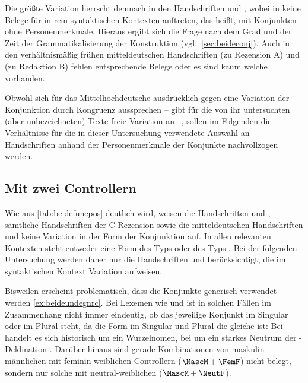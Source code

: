 Die größte Varia\-tion herrscht demnach in den Handschriften \citet{kc:A1} und
\citet{kc:VB}, wobei in \citet{kc:A1} keine Belege für 
in rein syntaktischen Kontexten auftreten, das heißt, mit Konjunkten ohne
Personen\-merkmale. Hieraus ergibt sich die Frage nach dem Grad und der Zeit
der Grammatikalisierung der Konstruktion (vgl.~\cref{sec:beideconj}). Auch in
den verhältnismäßig frühen mitteldeutschen Handschriften \citet{kc:H} (zu
Rezension A) und \citet{kc:P} (zu Redaktion B) fehlen entsprechende Belege oder
es sind kaum welche vorhanden.

Obwohl sich \citet{gjelsten1980,ksw2} für das Mittelhochdeutsche ausdrücklich
gegen eine Variation der Konjunktion  durch Kongruenz aussprechen
-- \citet{gjelsten1980} gibt für die von ihr untersuchten (aber unbezeichneten)
Texte freie Variation an --, sollen im Folgenden die Verhältnisse für die in
dieser Untersuchung verwendete Auswahl an \citet{kc}-Handschriften anhand
der Personen\-merkmale der Konjunkte nachvollzogen werden.

\subsection{Mit zwei Controllern}
\label{subsec:konj2ctrl}

Wie aus \cref{tab:beidefuncpos} deutlich wird, weisen die Handschriften
\citet{kc:M} und \citet{kc:B1}, sämtliche Handschriften der C-Rezension
\citep{kc:C1, kc:K, kc:Z} sowie die mitteldeutschen Handschriften \citet{kc:H}
und \citet{kc:P} keine Variation in der Form der Konjunktion auf. In allen
relevanten Kontexten steht entweder eine Form des Typs 
\citep{kc:H,kc:P,kc:Z} oder des Typs 
\citep{kc:M,kc:B1,kc:C1,kc:K}. Bei der folgenden Untersuchung werden daher nur
die Handschriften \citet{kc:A1} und \citet{kc:VB} berücksichtigt, die im
syntaktischen Kontext 
Variation aufweisen.

Bisweilen erscheint problematisch, dass die Konjunkte generisch verwendet
werden \cref{ex:beideundegnrc}. Bei Lexemen wie   und
  ist in solchen Fällen im Zusammen\-hang nicht immer
eindeutig, ob das jeweilige Konjunkt im Singular oder im Plural steht, da die
Form im Singular und Plural die gleiche ist: Bei  handelt es sich
historisch um ein Wurzelnomen, bei  um ein starkes Neutrum der
-Deklination \autocites[250, 294--295]{braune2018}[353--354,
584]{kroonen2013}. Darüber hinaus sind gerade Kombinationen von
maskulin-männlichen mit feminin-weiblichen Controllern ($\MascM+\FemF$) nicht
belegt, sondern nur solche mit neutral-weiblichen ($\MascM+\NeutF$).

